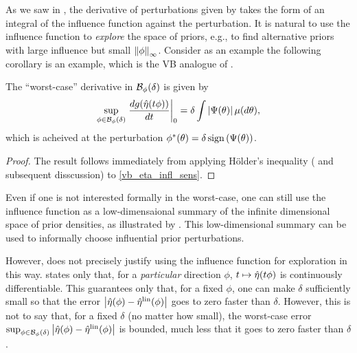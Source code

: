 As we saw in , the derivative of perturbations given
by  takes the form of an integral of the influence
function against the perturbation.  It is natural to use the influence function
to {\em explore} the space of priors, e.g., to find alternative priors with
large influence but small $\left\Vert\phi\right\Vert_{\infty}$.  Consider as an example the
following corollary is an example, which is the VB analogue of \citet[Result
11]{gustafson:1996:local}.


\begin{cor}
%
The ``worst-case'' derivative in $\mathcal{B}_\phi(\delta)$ is given by
%
\begin{align*}
%
\sup_{\phi \in \ball_\phi(\delta)}
    \fracat{d g(\etaopt(\t \phi))}{d \t}{0} =
        \delta \int \abs{\infl(\theta)} \mu(d\theta),
%
\end{align*}
%
which is acheived at the perturbation
$\phi^*(\theta) = \delta \, \mathrm{sign}\left(\Psi(\theta)\right)$.
%
\begin{proof}
%
The result follows immediately from applying H{\"o}lder's inequality
(\citet[Theorem 5.1.2]{dudley:2018:real} and subsequent disscussion)
to \eqref{vb_eta_infl_sens}.
%
\end{proof}
%
\end{cor}


Even if one is not interested formally in the worst-case, one can still use the
influence function as a low-dimensaional summary of the infinite dimensional
space of prior densities, as illustrated by .  This
low-dimensional summary can be used to informally choose influential
prior perturbations.

However,  does not precisely justify using the
influence function for exploration in this way.  
states only that, for a {\em particular} direction $\phi$, $t \mapsto
\hat\eta(t \phi)$ is continuously differentiable.  This guarantees only that,
for a fixed $\phi$, one can make $\delta$ sufficiently small so that the error
$\left|\hat\eta(\phi) - \hat\eta^{\mathrm{lin}}(\phi)\right|$ goes to zero faster than $\delta$.
However, this is not to say that, for a fixed $\delta$ (no matter how small),
the worst-case error $\sup_{\phi \in \mathcal{B}_\phi(\delta)} \left|\hat\eta(\phi) -
\hat\eta^{\mathrm{lin}}(\phi)\right|$ is bounded, much less that it goes to zero faster than $\delta$.

